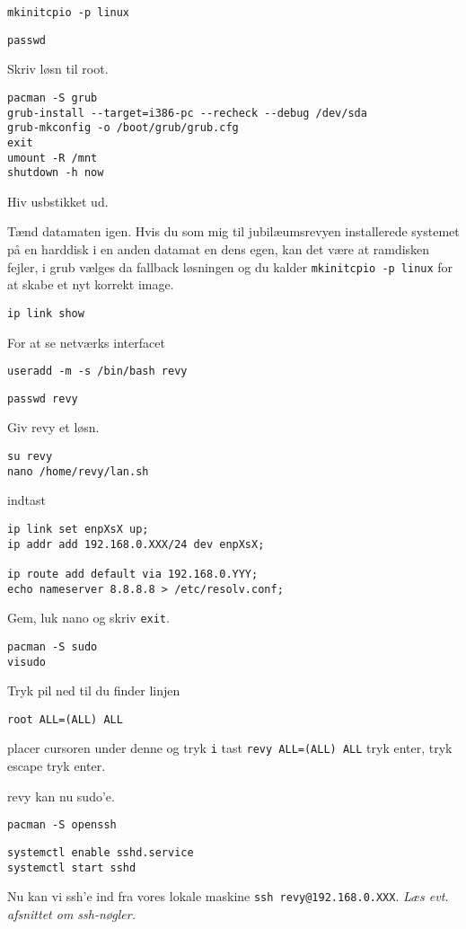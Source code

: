 \documentclass[10pt,a4paper,danish]{article}
\newcommand{\code}[1]{\colorbox{verbgray}{\texttt{#1}}}
\begin{document}
\begin{verbatim}
mkinitcpio -p linux
\end{verbatim}
\begin{verbatim}
passwd
\end{verbatim}
Skriv løsn til root.

\begin{verbatim}
pacman -S grub
grub-install --target=i386-pc --recheck --debug /dev/sda
grub-mkconfig -o /boot/grub/grub.cfg
exit
umount -R /mnt
shutdown -h now
\end{verbatim}
Hiv usbstikket ud.

Tænd datamaten igen.
Hvis du som mig til jubilæumsrevyen installerede systemet på en harddisk i en
anden datamat en dens egen, kan det være at ramdisken fejler, i grub vælges da
fallback løsningen og du kalder \code{mkinitcpio -p linux} for at skabe et nyt
korrekt image.

\begin{verbatim}
ip link show
\end{verbatim}
For at se netværks interfacet

\begin{verbatim}
useradd -m -s /bin/bash revy
\end{verbatim}
\begin{verbatim}
passwd revy
\end{verbatim}
Giv revy et løsn.


\begin{verbatim}
su revy
nano /home/revy/lan.sh
\end{verbatim}
indtast
\begin{verbatim}
ip link set enpXsX up;
ip addr add 192.168.0.XXX/24 dev enpXsX;

ip route add default via 192.168.0.YYY;
echo nameserver 8.8.8.8 > /etc/resolv.conf;
\end{verbatim}
Gem, luk nano og skriv \code{exit}.

\begin{verbatim}
pacman -S sudo
visudo
\end{verbatim}
Tryk pil ned til du finder linjen
\begin{verbatim}
root ALL=(ALL) ALL
\end{verbatim}
placer cursoren under denne og tryk \texttt{i}
tast \texttt{revy ALL=(ALL) ALL} tryk enter, tryk escape
tryk  enter.

revy kan nu sudo'e.

\begin{verbatim}
pacman -S openssh
\end{verbatim}
\begin{verbatim}
systemctl enable sshd.service
systemctl start sshd
\end{verbatim}
Nu kan vi ssh'e ind fra vores lokale maskine \code{ssh revy@192.168.0.XXX}.
\textit{Læs evt. afsnittet om ssh-nøgler.}
\end{document}
